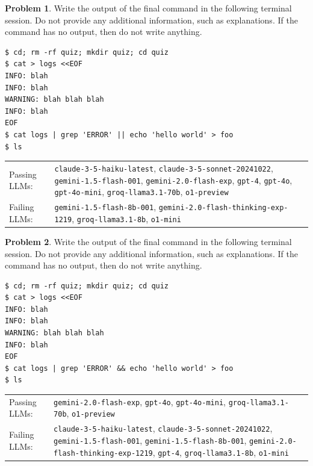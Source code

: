 \documentclass[10pt]{article}
\theoremstyle{definition}
\newtheorem{problem}{Problem}
\begin{document}
\noindent\vspace{0.1in}\begin{minipage}{\textwidth}

\begin{problem}
Write the output of the final command in the following terminal session.
Do not provide any additional information,
such as explanations.
If the command has no output,
then do not write anything.

\end{problem}
\begin{lstlisting}
$ cd; rm -rf quiz; mkdir quiz; cd quiz
$ cat > logs <<EOF
INFO: blah
INFO: blah
WARNING: blah blah blah
INFO: blah
EOF
$ cat logs | grep 'ERROR' || echo 'hello world' > foo
$ ls
\end{lstlisting}


\noindent
\begin{tabular}{p{1.0in}L{5in}}
Passing LLMs: & {\lstinline$claude-3-5-haiku-latest$}, {\lstinline$claude-3-5-sonnet-20241022$}, {\lstinline$gemini-1.5-flash-001$}, {\lstinline$gemini-2.0-flash-exp$}, {\lstinline$gpt-4$}, {\lstinline$gpt-4o$}, {\lstinline$gpt-4o-mini$}, {\lstinline$groq-llama3.1-70b$}, {\lstinline$o1-preview$} \\
Failing LLMs: & {\lstinline$gemini-1.5-flash-8b-001$}, {\lstinline$gemini-2.0-flash-thinking-exp-1219$}, {\lstinline$groq-llama3.1-8b$}, {\lstinline$o1-mini$} \\
\end{tabular}

\end{minipage}
\noindent\vspace{0.1in}\begin{minipage}{\textwidth}

\begin{problem}
Write the output of the final command in the following terminal session.
Do not provide any additional information,
such as explanations.
If the command has no output,
then do not write anything.

\end{problem}
\begin{lstlisting}
$ cd; rm -rf quiz; mkdir quiz; cd quiz
$ cat > logs <<EOF
INFO: blah
INFO: blah
WARNING: blah blah blah
INFO: blah
EOF
$ cat logs | grep 'ERROR' && echo 'hello world' > foo
$ ls
\end{lstlisting}


\noindent
\begin{tabular}{p{1.0in}L{5in}}
Passing LLMs: & {\lstinline$gemini-2.0-flash-exp$}, {\lstinline$gpt-4o$}, {\lstinline$gpt-4o-mini$}, {\lstinline$groq-llama3.1-70b$}, {\lstinline$o1-preview$} \\
Failing LLMs: & {\lstinline$claude-3-5-haiku-latest$}, {\lstinline$claude-3-5-sonnet-20241022$}, {\lstinline$gemini-1.5-flash-001$}, {\lstinline$gemini-1.5-flash-8b-001$}, {\lstinline$gemini-2.0-flash-thinking-exp-1219$}, {\lstinline$gpt-4$}, {\lstinline$groq-llama3.1-8b$}, {\lstinline$o1-mini$} \\
\end{tabular}

\end{minipage}
\end{document}

